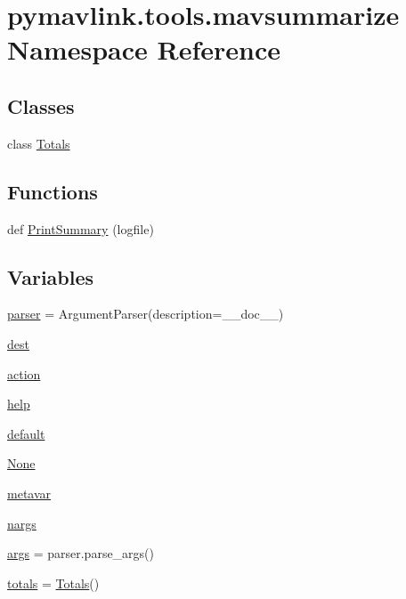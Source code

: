 \hypertarget{namespacepymavlink_1_1tools_1_1mavsummarize}{}\section{pymavlink.\+tools.\+mavsummarize Namespace Reference}
\label{namespacepymavlink_1_1tools_1_1mavsummarize}
\subsection*{Classes}
\begin{DoxyCompactItemize}
\item 
class \mbox{\hyperlink{classpymavlink_1_1tools_1_1mavsummarize_1_1Totals}{Totals}}
\end{DoxyCompactItemize}
\subsection*{Functions}
\begin{DoxyCompactItemize}
\item 
def \mbox{\hyperlink{namespacepymavlink_1_1tools_1_1mavsummarize_a18c485920e60829977222cc4c514c590}{Print\+Summary}} (logfile)
\end{DoxyCompactItemize}
\subsection*{Variables}
\begin{DoxyCompactItemize}
\item 
\mbox{\hyperlink{namespacepymavlink_1_1tools_1_1mavsummarize_a3ba68eafe41ac6abee79b85aaba7971e}{parser}} = Argument\+Parser(description=\+\_\+\+\_\+doc\+\_\+\+\_\+)
\item 
\mbox{\hyperlink{namespacepymavlink_1_1tools_1_1mavsummarize_a201c21b8b10b407aa5b0d1b0b0c531eb}{dest}}
\item 
\mbox{\hyperlink{namespacepymavlink_1_1tools_1_1mavsummarize_afe96e367938157d5dda6785a259fd70d}{action}}
\item 
\mbox{\hyperlink{namespacepymavlink_1_1tools_1_1mavsummarize_a1b9a3b5538b331f72681081719f2ab5f}{help}}
\item 
\mbox{\hyperlink{namespacepymavlink_1_1tools_1_1mavsummarize_a3b2477be194a7bc57b9ba46de40a3b86}{default}}
\item 
\mbox{\hyperlink{namespacepymavlink_1_1tools_1_1mavsummarize_a3640dd29d9df59b034dad4b4b1b80f7a}{None}}
\item 
\mbox{\hyperlink{namespacepymavlink_1_1tools_1_1mavsummarize_a0289f1a2b8fee0a6fc70a995e02b8319}{metavar}}
\item 
\mbox{\hyperlink{namespacepymavlink_1_1tools_1_1mavsummarize_a7e5d5d2f5e6edede0363c1263cde782c}{nargs}}
\item 
\mbox{\hyperlink{namespacepymavlink_1_1tools_1_1mavsummarize_aa553024892446aecf11bc6cc8f837cff}{args}} = parser.\+parse\+\_\+args()
\item 
\mbox{\hyperlink{namespacepymavlink_1_1tools_1_1mavsummarize_adaec538b723dbbab18ae0166aaf4ee1d}{totals}} = \mbox{\hyperlink{classpymavlink_1_1tools_1_1mavsummarize_1_1Totals}{Totals}}()
\end{DoxyCompactItemize}


